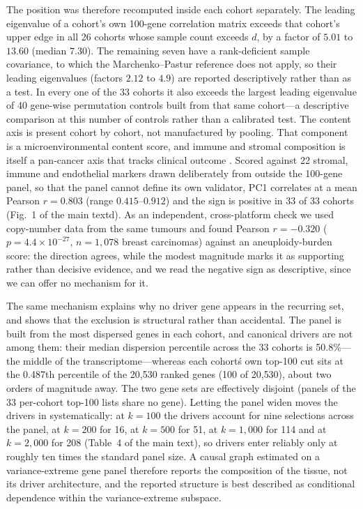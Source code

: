 \documentclass[11pt]{article}
\begin{document}
The position was therefore recomputed inside each cohort separately. The leading eigenvalue
of a cohort's own 100-gene correlation matrix exceeds that cohort's upper edge in all 26
cohorts whose sample count exceeds $d$, by a factor of $5.01$ to $13.60$ (median $7.30$). The
remaining seven have a rank-deficient sample covariance, to which the Marchenko--Pastur
reference does not apply, so their leading eigenvalues (factors $2.12$ to $4.9$) are reported
descriptively rather than as a test. In every one of the 33 cohorts it also exceeds the largest
leading eigenvalue of 40 gene-wise permutation controls built from that same cohort---a
descriptive comparison at this number of controls rather than a calibrated test. The
content axis is present cohort by cohort, not manufactured by pooling. That component is a microenvironmental content score, and immune and stromal composition is itself a pan-cancer axis that tracks clinical outcome \citep{bhinder2025deconvolution}. Scored against 22 stromal, immune and endothelial markers drawn deliberately from outside the 100-gene panel, so that the panel cannot define its own validator, PC1 correlates at a mean Pearson $r = 0.803$ (range $0.415$--$0.912$) and the sign is positive in 33 of 33 cohorts (Fig.~1 of the main textd). As an independent, cross-platform check we used copy-number data from the same tumours and found Pearson $r = -0.320$ ($p = 4.4 \times 10^{-27}$, $n = 1{,}078$ breast carcinomas) against an aneuploidy-burden score: the direction agrees, while the modest magnitude marks it as supporting rather than decisive evidence, and we read the negative sign as descriptive, since we can offer no mechanism for it.

The same mechanism explains why no driver gene appears in the recurring set, and shows that the exclusion is structural rather than accidental. The panel is built from the most dispersed genes in each cohort, and canonical drivers are not among them: their median dispersion percentile across the 33 cohorts is 50.8\%---the middle of the transcriptome---whereas each cohort\'s own top-100 cut sits at the 0.487th percentile of the 20{,}530 ranked genes (100 of 20{,}530), about two orders of magnitude away. The two gene sets are effectively disjoint (panels of the 33 per-cohort top-100 lists share no gene). Letting the panel widen moves the drivers in systematically: at $k = 100$ the drivers account for nine selections across the panel, at $k = 200$ for 16, at $k = 500$ for 51, at $k = 1{,}000$ for 114 and at $k = 2{,}000$ for 208 (Table~4 of the main text), so drivers enter reliably only at roughly ten times the standard panel size. A causal graph estimated on a variance-extreme gene panel therefore reports the composition of the tissue, not its driver architecture, and the reported structure is best described as conditional dependence within the variance-extreme subspace.
\end{document}
